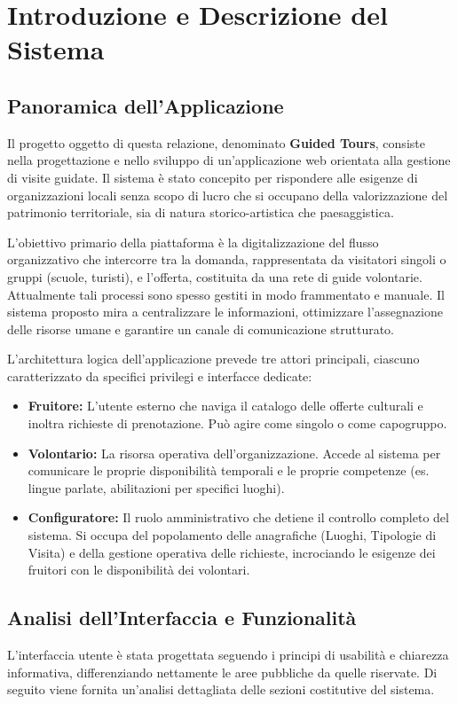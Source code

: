\chapter{Introduzione e Descrizione del Sistema}
\label{cap:intro}

\section{Panoramica dell'Applicazione}
Il progetto oggetto di questa relazione, denominato \textbf{Guided Tours}, consiste nella progettazione e nello sviluppo di un'applicazione web orientata alla gestione di visite guidate. Il sistema è stato concepito per rispondere alle esigenze di organizzazioni locali senza scopo di lucro che si occupano della valorizzazione del patrimonio territoriale, sia di natura storico-artistica che paesaggistica.

L'obiettivo primario della piattaforma è la digitalizzazione del flusso organizzativo che intercorre tra la domanda, rappresentata da visitatori singoli o gruppi (scuole, turisti), e l'offerta, costituita da una rete di guide volontarie. Attualmente tali processi sono spesso gestiti in modo frammentato e manuale. Il sistema proposto mira a centralizzare le informazioni, ottimizzare l'assegnazione delle risorse umane e garantire un canale di comunicazione strutturato.

L'architettura logica dell'applicazione prevede tre attori principali, ciascuno caratterizzato da specifici privilegi e interfacce dedicate:
\begin{itemize}
    \item \textbf{Fruitore:} L'utente esterno che naviga il catalogo delle offerte culturali e inoltra richieste di prenotazione. Può agire come singolo o come capogruppo.
    \item \textbf{Volontario:} La risorsa operativa dell'organizzazione. Accede al sistema per comunicare le proprie disponibilità temporali e le proprie competenze (es. lingue parlate, abilitazioni per specifici luoghi).
    \item \textbf{Configuratore:} Il ruolo amministrativo che detiene il controllo completo del sistema. Si occupa del popolamento delle anagrafiche (Luoghi, Tipologie di Visita) e della gestione operativa delle richieste, incrociando le esigenze dei fruitori con le disponibilità dei volontari.
\end{itemize}

\section{Analisi dell'Interfaccia e Funzionalità}
L'interfaccia utente è stata progettata seguendo i principi di usabilità e chiarezza informativa, differenziando nettamente le aree pubbliche da quelle riservate. Di seguito viene fornita un'analisi dettagliata delle sezioni costitutive del sistema.

